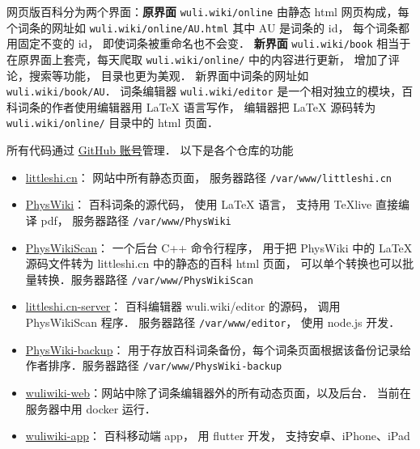 
网页版百科分为两个界面：\textbf{原界面} \verb|wuli.wiki/online| 由静态 html 网页构成，每个词条的网址如 \verb|wuli.wiki/online/AU.html| 其中 AU 是词条的 id， 每个词条都用固定不变的 id， 即使词条被重命名也不会变．  \textbf{新界面} \verb|wuli.wiki/book| 相当于在原界面上套壳，每天爬取 \verb|wuli.wiki/online/| 中的内容进行更新， 增加了评论，搜索等功能， 目录也更为美观． 新界面中词条的网址如 \verb|wuli.wiki/book/AU|．
词条编辑器 \verb|wuli.wiki/editor| 是一个相对独立的模块，百科词条的作者使用编辑器用 LaTeX 语言写作， 编辑器把 LaTeX 源码转为 \verb|wuli.wiki/online/| 目录中的 html 页面．

所有代码通过 \href{https://github.com/wuliwiki}{GitHub 账号}管理． 以下是各个仓库的功能
\begin{itemize}
\item \href{https://github.com/MacroUniverse/littleshi.cn}{littleshi.cn}： 网站中所有静态页面， 服务器路径 \verb|/var/www/littleshi.cn|
\item \href{https://github.com/MacroUniverse/PhysWiki}{PhysWiki}： 百科词条的源代码， 使用 LaTeX 语言， 支持用 TeXlive 直接编译 pdf， 服务器路径 \verb|/var/www/PhysWiki|
\item \href{https://github.com/MacroUniverse/PhysWikiScan}{PhysWikiScan}： 一个后台 C++ 命令行程序， 用于把 PhysWiki 中的 LaTeX 源码文件转为 littleshi.cn 中的静态的百科 html 页面， 可以单个转换也可以批量转换．服务器路径 \verb|/var/www/PhysWikiScan|
\item \href{https://github.com/MacroUniverse/littleshi.cn-server}{littleshi.cn-server}： 百科编辑器 wuli.wiki/editor 的源码， 调用 PhysWikiScan 程序． 服务器路径 \verb|/var/www/editor|， 使用 node.js 开发．
\item \href{https://github.com/MacroUniverse/PhysWiki-backup}{PhysWiki-backup}： 用于存放百科词条备份，每个词条页面根据该备份记录给作者排序．服务器路径 \verb|/var/www/PhysWiki-backup|
\item \href{https://github.com/MacroUniverse/wuliwiki-web}{wuliwiki-web}：网站中除了词条编辑器外的所有动态页面，以及后台． 当前在服务器中用 docker 运行．
\item \href{https://github.com/MacroUniverse/wuliwiki-app}{wuliwiki-app}： 百科移动端 app， 用 flutter 开发， 支持安卓、iPhone、iPad
\end{itemize}
